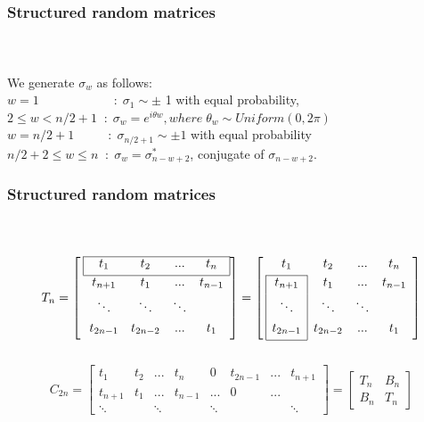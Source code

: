 \begin{frame}[t]
	\frametitle{Structured random matrices}
	\framesubtitle{~~}  %
	We generate $\sigma_{w}$ as follows:
    \\[1em]
    
    $w=1\qquad \qquad \qquad : \; \sigma_{1} \sim \pm$ 1 with equal probability,
    \\[1em]
    $2 \le w < n/2+1 \; \; : \; \sigma_{w}=e^{i\theta w}, where \; {\theta}_{w} \sim Uniform(0,2\pi) $
    \\[1em]
    $w=n/2+1 \qquad \; \; \, : \; \sigma_{n/2+1} \sim \pm 1 $ with equal probability 
    \\[1em]
    
    $n/2+2 \le w \le n \; \; : \; \sigma_{w}=\sigma^{*}_{n-w+2}$, conjugate of  $\sigma_{n-w+2}$.
    

\end{frame}

\begin{frame}[t]
	\frametitle{Structured random matrices}
	\framesubtitle{~~}  %
$$
T_{n} = \left[ \: 
\begin{array}{*{4}{c}}
\cline{1-4}
\multicolumn{1}{|c}{t_{1}} & t_{2} & ...& \multicolumn{1}{c|}{t_{n}}           \\[0.3em]
\cline{1-4}
	t_{n+1} & t_{1} & ... & t_{n-1} \\[0.3em]
	\ddots &\ddots & \ddots &    \\[0.3em]
	t_{2n-1} & t_{2n-2} & ... & t_{1}      \\[0.3em]    
	\end{array}
\right]
=
 \left[ \:
\begin{array}{*{4}{c}}
t_{1} & t_{2} & ...& t_{n}        \\[0.3em]
\cline{1-1}
\multicolumn{1}{|c|}{t_{n+1}} & t_{1} & ... & t_{n-1} \\[0.3em]
\multicolumn{1}{|c|}{\ddots} & \ddots & \ddots &    \\[0.3em]
\multicolumn{1}{|c|}{t_{2n-1}} & t_{2n-2} & ... & t_{1}          \\[0.3em]
\cline{1-1}
\end{array}
\right]
$$
\\
$$
C_{2n} =\begin{bmatrix}
	t_{1} & t_{2} & ...& t_{n} & 0 & t_{2n-1} & ...&  t_{n+1}           \\[0.3em]
    t_{n+1} & t_{1}  & ... & t_{n-1} & ... & 0 & ...&    \\[0.3em]
	\ddots &  & \ddots & & \ddots &  & &\ddots 
\end{bmatrix}
 =
 \begin{bmatrix}
	T_{n} & B_{n}            \\[0.3em]
	B_{n} & T_{n}   
\end{bmatrix}
$$
	
\end{frame}

